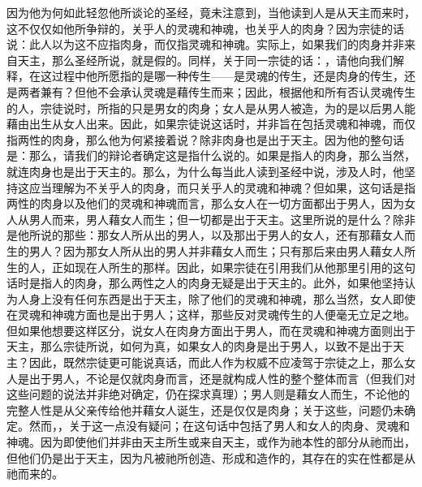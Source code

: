 因为他为何如此轻忽他所谈论的圣经，竟未注意到，当他读到人是从天主而来时，这不仅仅如他所争辩的，关乎人的灵魂和神魂，也关乎人的肉身？因为宗徒的话说：此人以为这不应指肉身，而仅指灵魂和神魂。实际上，如果我们的肉身并非来自天主，那么圣经所说，就是假的。同样，关于同一宗徒的话：，请他向我们解释，在这过程中他所愿指的是哪一种传生——是灵魂的传生，还是肉身的传生，还是两者兼有？但他不会承认灵魂是藉传生而来；因此，根据他和所有否认灵魂传生的人，宗徒说时，所指的只是男女的肉身；女人是从男人被造，为的是以后男人能藉由出生从女人出来。因此，如果宗徒说这话时，并非旨在包括灵魂和神魂，而仅指两性的肉身，那么他为何紧接着说？除非肉身也是出于天主。因为他的整句话是：那么，请我们的辩论者确定这是指什么说的。如果是指人的肉身，那么当然，就连肉身也是出于天主的。那么，为什么每当此人读到圣经中说，涉及人时，他坚持这应当理解为不关乎人的肉身，而只关乎人的灵魂和神魂？但如果，这句话是指两性的肉身以及他们的灵魂和神魂而言，那么女人在一切方面都出于男人，因为女人从男人而来，男人藉女人而生；但一切都是出于天主。这里所说的是什么？除非是他所说的那些：那女人所从出的男人，以及那出于男人的女人，还有那藉女人而生的男人？因为那女人所从出的男人并非藉女人而生；只有那后来由男人藉女人所生的人，正如现在人所生的那样。因此，如果宗徒在引用我们从他那里引用的这句话时是指人的肉身，那么两性之人的肉身无疑是出于天主的。此外，如果他坚持认为人身上没有任何东西是出于天主，除了他们的灵魂和神魂，那么当然，女人即使在灵魂和神魂方面也是出于男人；这样，那些反对灵魂传生的人便毫无立足之地。但如果他想要这样区分，说女人在肉身方面出于男人，而在灵魂和神魂方面则出于天主，那么宗徒所说，如何为真，如果女人的肉身是出于男人，以致不是出于天主？因此，既然宗徒更可能说真话，而此人作为权威不应凌驾于宗徒之上，那么女人是出于男人，不论是仅就肉身而言，还是就构成人性的整个整体而言（但我们对这些问题的说法并非绝对确定，仍在探求真理）；男人则是藉女人而生，不论他的完整人性是从父亲传给他并藉女人诞生，还是仅仅是肉身；关于这些，问题仍未确定。然而，，关于这一点没有疑问；在这句话中包括了男人和女人的肉身、灵魂和神魂。因为即使他们并非由天主所生或来自天主，或作为祂本性的部分从祂而出，但他们仍是出于天主，因为凡被祂所创造、形成和造作的，其存在的实在性都是从祂而来的。\par

